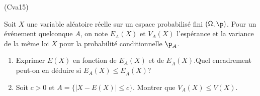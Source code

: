 \begin{tiny}(Cva15)\end{tiny} Soit $X$ une variable aléatoire réelle sur un espace probabilisé fini $(\Omega, \p)$. Pour un événement quelconque $A$, on note $E_A(X)$ et $V_A(X)$ l'espérance et la variance de la même loi $X$ pour la probabilité conditionnelle $\p_A$.
\begin{enumerate}
 \item Exprimer $E(X)$ en fonction de $E_A(X)$ et de $E_{\overline{A}}(X)$.\newline Quel encadrement peut-on en déduire si $E_A(X)\leq E_{\overline{A}}(X)$?
 \item Soit $c>0$ et $A=\{|X-E(X)|\leq c\}$. Montrer que $V_A(X)\leq V(X)$.
\end{enumerate}
 